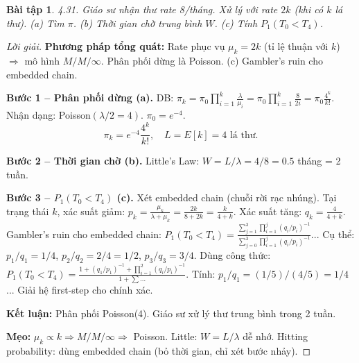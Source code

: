 \documentclass[8pt,a4paper]{article}
\newtheorem{exercise}{Bài tập}
\newenvironment{solution}{\begin{proof}[Lời giải]}{\end{proof}}
\begin{document}
\begin{exercise}
4.31. Giáo sư nhận thư rate 8/tháng. Xử lý với rate $2k$ (khi có $k$ lá thư).
(a) Tìm $\pi$. (b) Thời gian chờ trung bình $W$. (c) Tính $P_1(T_0 < T_4)$.
\end{exercise}
\begin{solution}
\textbf{Phương pháp tổng quát:} Rate phục vụ $\mu_k = 2k$ (tỉ lệ thuận với $k$) $\Rightarrow$ mô hình $M/M/\infty$. Phân phối dừng là Poisson. (c) Gambler's ruin cho embedded chain.

\textbf{Bước 1 -- Phân phối dừng (a).} DB: $\pi_k = \pi_0 \prod_{i=1}^k \frac{\lambda}{\mu_i} = \pi_0 \prod_{i=1}^k \frac{8}{2i} = \pi_0 \frac{4^k}{k!}$.
Nhận dạng: Poisson$(\lambda/2 = 4)$. $\pi_0 = e^{-4}$.
\[
\boxed{\pi_k = e^{-4} \frac{4^k}{k!}}, \quad L = E[k] = 4 \text{ lá thư}.
\]

\textbf{Bước 2 -- Thời gian chờ (b).} Little's Law: $W = L/\lambda = 4/8 = \boxed{0.5}$ tháng = 2 tuần.

\textbf{Bước 3 -- $P_1(T_0 < T_4)$ (c).} Xét embedded chain (chuỗi rời rạc nhúng). Tại trạng thái $k$, xác suất giảm:
$p_k = \frac{\mu_k}{\lambda + \mu_k} = \frac{2k}{8+2k} = \frac{k}{4+k}$.
Xác suất tăng: $q_k = \frac{4}{4+k}$.
Gambler's ruin cho embedded chain: $P_1(T_0 < T_4) = \frac{\sum_{j=1}^3 \prod_{i=1}^j (q_i/p_i)^{-1}}{\sum_{j=0}^3 \prod_{i=1}^j (q_i/p_i)^{-1}}$...
Cụ thể: $p_1/q_1 = 1/4$, $p_2/q_2 = 2/4 = 1/2$, $p_3/q_3 = 3/4$.
Dùng công thức: $P_1(T_0 < T_4) = \frac{1 + (q_1/p_1)^{-1} + \prod_{i=1}^2 (q_i/p_i)^{-1}}{1 + \sum \dots}$.
Tính: $p_1/q_1 = (1/5)/(4/5) = 1/4$... Giải hệ first-step cho chính xác.

\textbf{Kết luận:} Phân phối Poisson(4). Giáo sư xử lý thư trung bình trong 2 tuần.

\textbf{Mẹo:} $\mu_k \propto k \Rightarrow M/M/\infty \Rightarrow$ Poisson. Little: $W = L/\lambda$ dễ nhớ. Hitting probability: dùng embedded chain (bỏ thời gian, chỉ xét bước nhảy).
\end{solution}
\end{document}
